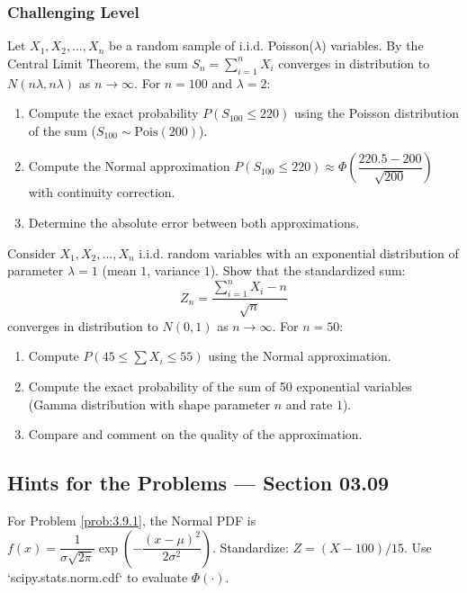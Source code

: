 \subsubsection*{Challenging Level}

\begin{problema}
	\label{prob:3.9.9}
	Let $X_{1}, X_{2}, \dots, X_{n}$ be a random sample of i.i.d. Poisson($\lambda$) variables. By the Central Limit Theorem, the sum $S_{n} = \sum_{i=1}^{n} X_{i}$ converges in distribution to $N(n\lambda, n\lambda)$ as $n \to \infty$. For $n = 100$ and $\lambda = 2$:
	\begin{enumerate}
		\item Compute the exact probability $P(S_{100} \le 220)$ using the Poisson distribution of the sum ($S_{100} \sim \text{Pois}(200)$).
		\item Compute the Normal approximation $P(S_{100} \le 220) \approx \Phi\left(\dfrac{220.5 - 200}{\sqrt{200}}\right)$ with continuity correction.
		\item Determine the absolute error between both approximations.
	\end{enumerate}
\end{problema}

\begin{problema}
	\label{prob:3.9.10}
	Consider $X_{1}, X_{2}, \dots, X_{n}$ i.i.d. random variables with an exponential distribution of parameter $\lambda = 1$ (mean $1$, variance $1$). Show that the standardized sum:
	$$Z_{n} = \dfrac{\sum_{i=1}^{n} X_{i} - n}{\sqrt{n}}$$
	converges in distribution to $N(0, 1)$ as $n \to \infty$. For $n = 50$:
	\begin{enumerate}
		\item Compute $P(45 \le \sum X_{i} \le 55)$ using the Normal approximation.
		\item Compute the exact probability of the sum of 50 exponential variables (Gamma distribution with shape parameter $n$ and rate $1$).
		\item Compare and comment on the quality of the approximation.
	\end{enumerate}
\end{problema}

\subsection*{Hints for the Problems --- Section 03.09}

\begin{sugerencia}
	\label{sug:3.9.1}
	For Problem \ref{prob:3.9.1}, the Normal PDF is $f(x) = \dfrac{1}{\sigma\sqrt{2\pi}} \exp\left(-\dfrac{(x-\mu)^{2}}{2\sigma^{2}}\right)$. Standardize: $Z = (X - 100)/15$. Use `scipy.stats.norm.cdf` to evaluate $\Phi(\cdot)$.
\end{sugerencia}


